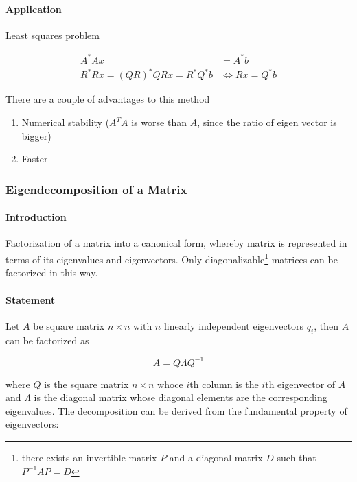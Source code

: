 \paragraph{Application} Least squares problem

\begin{equation*}
    \begin{split}
        A^*Ax & = A^*b\\
        R^*Rx = (QR)^*QRx = R^*Q^*b & \Leftrightarrow Rx = Q^*b
    \end{split}
\end{equation*}

There are a couple of advantages to this method
\begin{enumerate}[itemsep=0pt]
    \item Numerical stability ($A^TA$ is worse than $A$, since the ratio of eigen vector is bigger)
    \item Faster
\end{enumerate}

\subsubsection{Eigendecomposition of a Matrix} \label{sec:eigen-decomp}

\paragraph{Introduction} Factorization of a matrix into a canonical form, whereby matrix
is represented in terms of its eigenvalues and eigenvectors. Only diagonalizable\footnote{
    there exists an invertible matrix $P$ and a diagonal matrix $D$ such that $P^{-1}AP=D$
}
matrices can be factorized in this way.

\paragraph{Statement} Let $A$ be square matrix $n \times n$ with $n$ linearly independent
eigenvectors $q_i$, then $A$ can be factorized as 

\begin{equation*}
    A = Q\Lambda Q^{-1}
\end{equation*}

where $Q$ is the square matrix $n \times n$ whoce $i$th column is the $i$th eigenvector of 
$A$ and $\Lambda$ is the diagonal matrix whose diagonal elements are the corresponding
eigenvalues. The decomposition can be derived from the fundamental property of eigenvectors:

